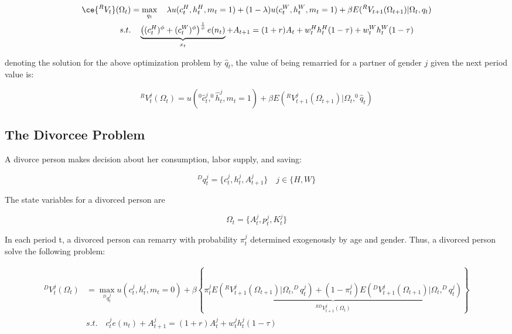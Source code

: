\begin{align}
\ce{^{R}V_t}(\Omega_t)  &= \max_{q_t} \quad  \lambda u(c_t^H, h_t^H, m_t =1) + (1 - \lambda) u(c_t^W, h_t^W, m_t = 1) + \beta E(^RV_{t+1} (\Omega_{t+1})| \Omega_t, q_t) \nonumber \\
s.t. & \quad  \underbrace{\left ((c_t^H )^\phi + (c_t^W )^\phi  \right )^{\frac{1}{\phi}} e(n_t)}_{x_t} + A_{t+1} = (1+r) A_t + w_t^H h_t^H (1- \tau) + w_t^W h_t^W (1 - \tau) \nonumber 
\end{align}

denoting the solution for the above optimization problem by $\hat q_t$, the value of being remarried for a partner of gender $j$  given the next period value is:

\begin{equation*}
^{R}V_t^j (\Omega_t) = u(^0 \hat c_t^j, ^0 \hat h_t^j, m_t = 1) + \beta E \left (^RV^j_{t+1}(\Omega_{t+1}) | \Omega_t, ^{0} \hat q_t \right ) 
\end{equation*}





\subsection{The Divorcee Problem}
A divorce person makes decision about her consumption, labor supply, and saving:

\begin{equation*}
 ^{D}q_t^j = \{c_t^j, h_t^j, A_{t+1}^j \} \quad  j \in \{H, W\}
\end{equation*}

\noindent The state variables for a divorced person are 

\begin{equation*}
\Omega_t = \{ A_t^j, p_t^j, K_t^j \} 
\end{equation*}

\noindent In each period t, a divorced person can remarry with probability $\pi_t^j$  determined exogenously by age and gender. Thus, a divorced person solve the following problem: 

\begin{align*}
^{D}V_t^j (\Omega_t) &= \max_{^{D}q_t^j} u(c_t^j, h_t^j, m_t = 0) + \beta \left \{ \underbrace{\pi_t^j  E \left (^{R}V_{t+1}^j (\Omega_{t+1}) | \Omega_t, ^{D}q_t^j  \right )+ (1-\pi_t^j ) E \left (^{D}V_{t+1}^j (\Omega_{t+1}) | \Omega_t, ^{D}q_t^j  \right )}_{^{RD}V^j_{t+1} (\Omega_t)}\right \} \\
& s.t. \quad  c_t^j e(n_t) + A_{t+1}^j = (1+r) A_t^j + w_t^j h_t^j (1 - \tau)
\end{align*}

